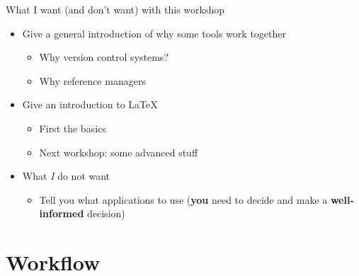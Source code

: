 \documentclass[ignorenonframetext,]{beamer}
\begin{document}
\begin{frame}{What I want (and don't want) with this workshop}

\begin{itemize}
\item
  Give a general introduction of why some tools work together

  \begin{itemize}
  \itemsep1pt\parskip0pt
  \item
    Why version control systems?
  \item
    Why reference managers
  \end{itemize}
\item
  Give an introduction to \LaTeX

  \begin{itemize}
  \itemsep1pt\parskip0pt
  \item
    First the basics
  \item
    Next workshop: some advanced stuff
  \end{itemize}
\item
  What \emph{I} do not want

  \begin{itemize}
  \itemsep1pt\parskip0pt
  \item
    Tell you what applications to use (\textbf{you} need to decide and
    make a \textbf{well-informed} decision)
  \end{itemize}
\end{itemize}

\end{frame}

\section{Workflow}\label{workflow}
\end{document}

